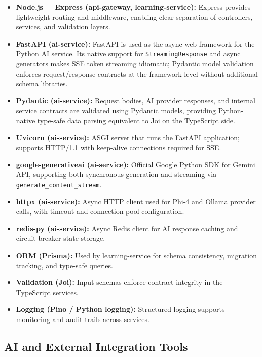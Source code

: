 \begin{itemize}
    \item \textbf{Node.js + Express (api-gateway, learning-service):} Express provides lightweight routing and middleware, enabling clear separation of controllers, services, and validation layers.
    \item \textbf{FastAPI (ai-service):} FastAPI is used as the async web framework for the Python AI service. Its native support for \texttt{StreamingResponse} and async generators makes SSE token streaming idiomatic; Pydantic model validation enforces request/response contracts at the framework level without additional schema libraries.
    \item \textbf{Pydantic (ai-service):} Request bodies, AI provider responses, and internal service contracts are validated using Pydantic models, providing Python-native type-safe data parsing equivalent to Joi on the TypeScript side.
    \item \textbf{Uvicorn (ai-service):} ASGI server that runs the FastAPI application; supports HTTP/1.1 with keep-alive connections required for SSE.
    \item \textbf{google-generativeai (ai-service):} Official Google Python SDK for Gemini API, supporting both synchronous generation and streaming via \texttt{generate\_content\_stream}.
    \item \textbf{httpx (ai-service):} Async HTTP client used for Phi-4 and Ollama provider calls, with timeout and connection pool configuration.
    \item \textbf{redis-py (ai-service):} Async Redis client for AI response caching and circuit-breaker state storage.
    \item \textbf{ORM (Prisma):} Used by learning-service for schema consistency, migration tracking, and type-safe queries.
    \item \textbf{Validation (Joi):} Input schemas enforce contract integrity in the TypeScript services.
    \item \textbf{Logging (Pino / Python logging):} Structured logging supports monitoring and audit trails across services.
\end{itemize}

\subsection{AI and External Integration Tools}

